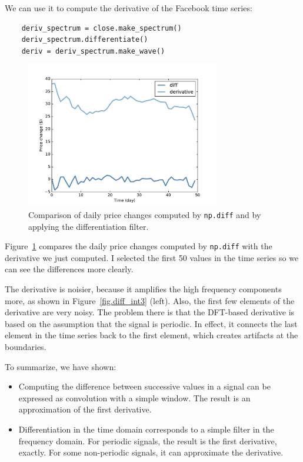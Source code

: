 \documentclass[12pt]{book}
\begin{document}
We can use it to compute the derivative of the Facebook time series:

\begin{verbatim}
    deriv_spectrum = close.make_spectrum()
    deriv_spectrum.differentiate()
    deriv = deriv_spectrum.make_wave()
\end{verbatim}

\begin{figure}
\centerline{\includegraphics[height=2.5in]{figs/diff_int4.pdf}}
\caption{Comparison of daily price changes computed by
{\tt np.diff} and by applying the differentiation filter.}
\label{fig.diff_int4}
\end{figure}

Figure~\ref{fig.diff_int4} compares the daily price changes computed by
{\tt np.diff} with the derivative we just computed.
I selected the first 50 values in the time series so we can see the
differences more clearly.

The derivative is noisier, because it amplifies the high frequency
components more, as shown in Figure~\ref{fig.diff_int3} (left).  Also, the
first few elements of the derivative are very noisy.  The problem
there is that the DFT-based derivative is based on the assumption that
the signal is periodic.  In effect, it connects the last element in
the time series back to the first element, which creates artifacts at
the boundaries.

To summarize, we have shown:

\begin{itemize}

\item Computing the difference between successive values in a signal
  can be expressed as convolution with a simple window.  The result is
  an approximation of the first derivative.

\item Differentiation in the time domain corresponds to a simple
  filter in the frequency domain.  For periodic signals, the result is
  the first derivative, exactly.  For some non-periodic signals, it
  can approximate the derivative.

\end{itemize}
\end{document}
